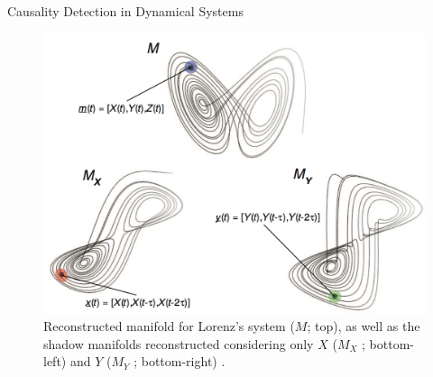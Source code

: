 \documentclass[final]{beamer}
\begin{document}
\begin{frame}{}
\begin{textblock}{22}
\begin{block}{Causality Detection in Dynamical Systems}
\begin{figure}
\includegraphics[width=14cm]{lorenz2.png}
\hspace{0.5em}
\hspace{0.5em}
\caption{Reconstructed manifold for Lorenz’s system ($M$; top), as well as the shadow manifolds reconstructed considering only $X$ ($M_X$ ; bottom-left) and $Y$ ($M_Y$ ; bottom-right) \cite{Sugihara12}.}
\label{fig:lorenz}
\end{figure}

\end{block}
\end{textblock}
\end{frame}
\end{document}
